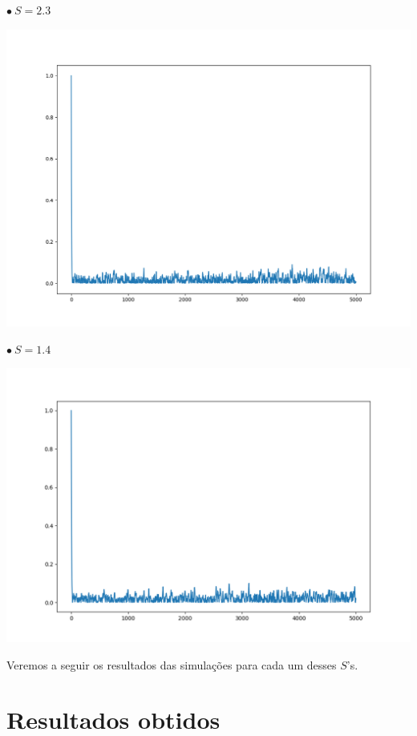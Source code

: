 \documentclass[pt12]{article}
\begin{document}
\begin{small} $\bullet \ S = 2.3$ \end{small}
\begin{center} \includegraphics[scale=0.51]{Autocorrelacao_sig_2_3.png} \end{center}


\begin{small} $\bullet \ S = 1.4$ \end{small}
\begin{center} \includegraphics[scale=0.57]{Autocorrelacao_sig_1_4.png} \end{center}
\newpage

Veremos a seguir os resultados das simulações para cada um desses $S$'s.

\section{Resultados obtidos}
\ 
\end{document}
